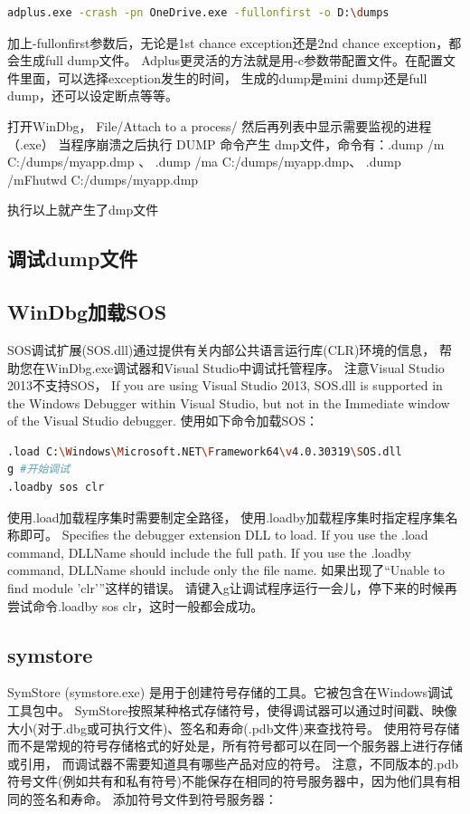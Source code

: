\documentclass{book}
\begin{document}
\begin{lstlisting}[language=Bash]
adplus.exe -crash -pn OneDrive.exe -fullonfirst -o D:\dumps
\end{lstlisting}

加上-fullonfirst参数后，无论是1st chance exception还是2nd chance exception，都会生成full dump文件。
Adplus更灵活的方法就是用-c参数带配置文件。在配置文件里面，可以选择exception发生的时间，
生成的dump是mini dump还是full dump，还可以设定断点等等。

打开WinDbg， File/Attach to a process/  然后再列表中显示需要监视的进程（.exe）
当程序崩溃之后执行 DUMP 命令产生 dmp文件，命令有：.dump /m C:/dumps/myapp.dmp 、
.dump /ma C:/dumps/myapp.dmp、 .dump /mFhutwd C:/dumps/myapp.dmp

执行以上就产生了dmp文件

\subsection{调试dump文件}
\subsection{WinDbg加载SOS}

SOS调试扩展(SOS.dll)通过提供有关内部公共语言运行库(CLR)环境的信息，
帮助您在WinDbg.exe调试器和Visual Studio中调试托管程序。
注意Visual Studio 2013不支持SOS，
If you are using Visual Studio 2013, 
SOS.dll is supported in the Windows Debugger within Visual Studio, but not in the Immediate window of the Visual Studio debugger.
使用如下命令加载SOS：

\begin{lstlisting}[language=Bash]
.load C:\Windows\Microsoft.NET\Framework64\v4.0.30319\SOS.dll
g #开始调试
.loadby sos clr
\end{lstlisting}

使用.load加载程序集时需要制定全路径，
使用.loadby加载程序集时指定程序集名称即可。
Specifies the debugger extension DLL to load. 
If you use the .load command, DLLName should include the full path. 
If you use the .loadby command, DLLName should include only the file name. 
如果出现了“Unable to find module 'clr'”这样的错误。
请键入g让调试程序运行一会儿，停下来的时候再尝试命令.loadby sos clr，这时一般都会成功。

\subsection{symstore}

SymStore (symstore.exe) 是用于创建符号存储的工具。它被包含在Windows调试工具包中。
SymStore按照某种格式存储符号，使得调试器可以通过时间戳、映像大小(对于.dbg或可执行文件)、签名和寿命(.pdb文件)来查找符号。
使用符号存储而不是常规的符号存储格式的好处是，所有符号都可以在同一个服务器上进行存储或引用，
而调试器不需要知道具有哪些产品对应的符号。
注意，不同版本的.pdb符号文件(例如共有和私有符号)不能保存在相同的符号服务器中，因为他们具有相同的签名和寿命。
添加符号文件到符号服务器：
\end{document}
